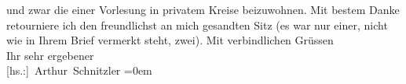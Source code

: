 \begin{ledgroupsized}[t]{13cm}
               und zwar die einer Vorlesung in privatem Kreise beizuwohnen.\pend
           \pstart
           {\pb}Mit bestem Danke retourniere ich den freundlichst
               an mich gesandten Sitz (es war nur einer, nicht wie in Ihrem Brief vermerkt steht,
               zwei).\pend
           \pstart
           Mit verbindlichen Grüssen{\\[\baselineskip]}Ihr sehr ergebener{\\[\baselineskip]}\spacefill\mbox{{[}hs.:{]} Arthur Schnitzler}\pend
           \leftskip=0em{}          \endnumbering{}\end{ledgroupsized}  \newcommand{\dateiname}{L02322}\newcommand{\titel}{Arthur Schnitzler an Georg Engländer, 3. 3. 1919}\newcommand{\editorInnen}{Martin Anton Müller und Gerd-Hermann Susen}
            \footnotesize
\begin{ledgroupsized}[t]{11.5cm}
\end{ledgroupsized}
         
      